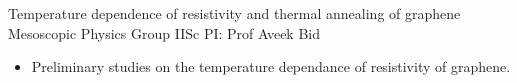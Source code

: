 
        {Temperature dependence of resistivity and thermal annealing of graphene}
        {\newline Mesoscopic Physics Group}
        {IISc}
        {PI: Prof Aveek Bid}{
    \begin{itemize}
        \item Preliminary studies on the temperature dependance of resistivity of graphene. 
    \end{itemize}
}
